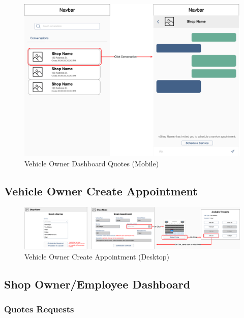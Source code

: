 \documentclass[12pt, titlepage]{article}
\begin{document}
\begin{figure}[H]
	\centering
	\includegraphics[width=\textwidth]{mockups/Vehicle Owner Dashboard (Quotes) (Mobile).png}
	\caption{Vehicle Owner Dashboard \textemdash{} Quotes (Mobile)}
\end{figure}

\subsection{Vehicle Owner Create Appointment}

\begin{figure}[H]
	\centering
	\includegraphics[width=\textwidth]{mockups/Vehicle Owner - Create Appointment Popup (Desktop).png}
	\caption{Vehicle Owner Create Appointment (Desktop)}
\end{figure}

\subsection{Shop Owner/Employee Dashboard}
\subsubsection{Quotes Requests}
\end{document}
